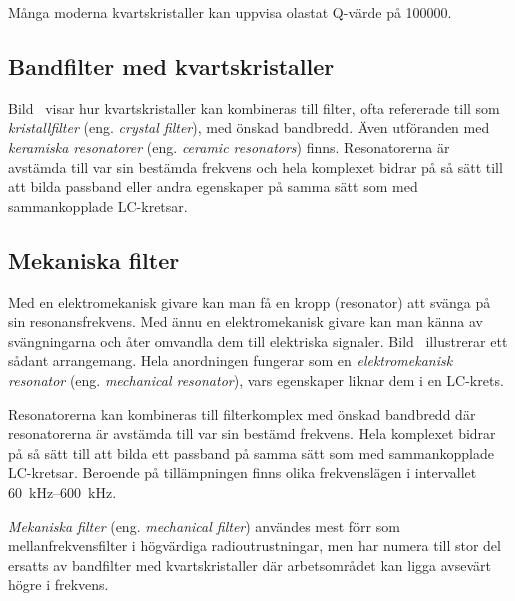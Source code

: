 Många moderna kvartskristaller kan uppvisa olastat Q-värde på \num{100000}.

\vspace{12pt} %

\subsection{Bandfilter med kvartskristaller}
\label{bandfilter_kristall}


Bild~ visar hur kvartskristaller kan kombineras till
filter, ofta refererade till som \emph{kristallfilter} (eng.
\emph{crystal filter}), med önskad bandbredd.
Även utföranden med \emph{keramiska resonatorer} (eng.
\emph{ceramic resonators}) finns.
Resonatorerna är avstämda till var sin bestämda frekvens och hela komplexet
bidrar på så sätt till att bilda passband eller andra egenskaper på samma sätt
som med sammankopplade LC-kretsar.

\subsection{Mekaniska filter}

Med en elektromekanisk givare kan man få en kropp (resonator) att svänga på sin
resonansfrekvens.
Med ännu en elektromekanisk givare kan man känna av svängningarna och
åter omvandla dem till elektriska signaler.
Bild~ illustrerar ett sådant arrangemang.
Hela anordningen fungerar som en \emph{elektromekanisk resonator} (eng.
\emph{mechanical resonator}), vars egenskaper liknar dem i en LC-krets.

Resonatorerna kan kombineras till filterkomplex med önskad bandbredd där
resonatorerna är avstämda till var sin bestämd frekvens.
Hela komplexet bidrar på så sätt till att bilda ett passband på samma sätt som
med sammankopplade LC-kretsar.
Beroende på tillämpningen finns olika frekvenslägen i intervallet
\SIrange{60}{600}{\kilo\hertz}.

\emph{Mekaniska filter} (eng. \emph{mechanical filter}) användes mest förr som
mellanfrekvensfilter i högvärdiga radioutrustningar, men har numera till stor
del ersatts av bandfilter med kvartskristaller där arbetsområdet kan ligga
avsevärt högre i frekvens.



